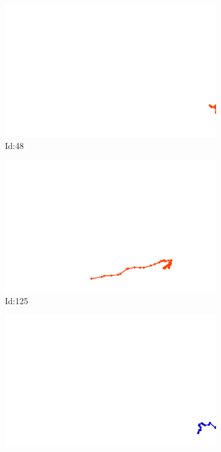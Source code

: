 \documentclass[12pt,twoside]{report}
\begin{document}
\begin{figure}
\centering
\begin{subfigure}[b]{0.20\textwidth}
\centering
\includegraphics[width=\textwidth]{../trajectories/48.png}
\caption{Id:48}
\end{subfigure}
\begin{subfigure}[b]{0.20\textwidth}
\centering
\includegraphics[width=\textwidth]{../trajectories/125.png}
\caption{Id:125}
\end{subfigure}
\begin{subfigure}[b]{0.20\textwidth}
\centering
\includegraphics[width=\textwidth]{../trajectories/144.png}

\end{subfigure}
\end{figure}
\end{document}
